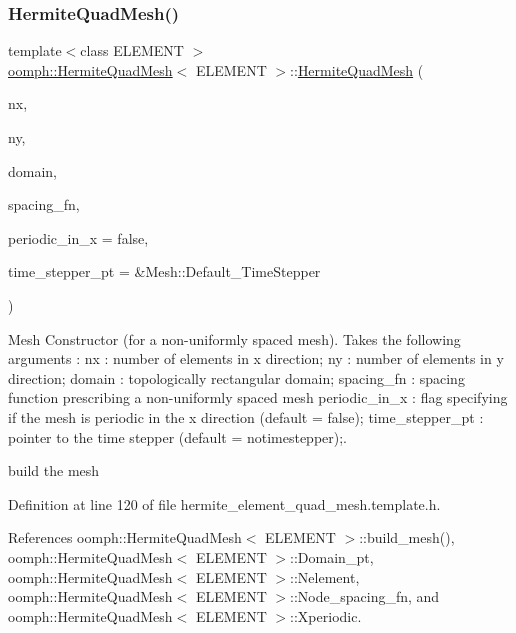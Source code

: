 \subsubsection{\texorpdfstring{Hermite\+Quad\+Mesh()}{HermiteQuadMesh()}\hspace{0.1cm}{\footnotesize\ttfamily [2/2]}}
{\footnotesize\ttfamily template$<$class E\+L\+E\+M\+E\+NT $>$ \\
\hyperlink{classoomph_1_1HermiteQuadMesh}{oomph\+::\+Hermite\+Quad\+Mesh}$<$ E\+L\+E\+M\+E\+NT $>$\+::\hyperlink{classoomph_1_1HermiteQuadMesh}{Hermite\+Quad\+Mesh} (\begin{DoxyParamCaption}\item[{const unsigned \&}]{nx,  }\item[{const unsigned \&}]{ny,  }\item[{\hyperlink{classoomph_1_1TopologicallyRectangularDomain}{Topologically\+Rectangular\+Domain} $\ast$}]{domain,  }\item[{const \hyperlink{classoomph_1_1HermiteQuadMesh_abebf4806b300591f976398404ed0ef3f}{Mesh\+Spacing\+Fn\+Ptr}}]{spacing\+\_\+fn,  }\item[{const bool \&}]{periodic\+\_\+in\+\_\+x = {\ttfamily false},  }\item[{Time\+Stepper $\ast$}]{time\+\_\+stepper\+\_\+pt = {\ttfamily \&Mesh\+:\+:Default\+\_\+TimeStepper} }\end{DoxyParamCaption})\hspace{0.3cm}{\ttfamily [inline]}}



Mesh Constructor (for a non-\/uniformly spaced mesh). Takes the following arguments \+: nx \+: number of elements in x direction; ny \+: number of elements in y direction; domain \+: topologically rectangular domain; spacing\+\_\+fn \+: spacing function prescribing a non-\/uniformly spaced mesh periodic\+\_\+in\+\_\+x \+: flag specifying if the mesh is periodic in the x direction (default = false); time\+\_\+stepper\+\_\+pt \+: pointer to the time stepper (default = notimestepper);. 

build the mesh 

Definition at line 120 of file hermite\+\_\+element\+\_\+quad\+\_\+mesh.\+template.\+h.



References oomph\+::\+Hermite\+Quad\+Mesh$<$ E\+L\+E\+M\+E\+N\+T $>$\+::build\+\_\+mesh(), oomph\+::\+Hermite\+Quad\+Mesh$<$ E\+L\+E\+M\+E\+N\+T $>$\+::\+Domain\+\_\+pt, oomph\+::\+Hermite\+Quad\+Mesh$<$ E\+L\+E\+M\+E\+N\+T $>$\+::\+Nelement, oomph\+::\+Hermite\+Quad\+Mesh$<$ E\+L\+E\+M\+E\+N\+T $>$\+::\+Node\+\_\+spacing\+\_\+fn, and oomph\+::\+Hermite\+Quad\+Mesh$<$ E\+L\+E\+M\+E\+N\+T $>$\+::\+Xperiodic.

